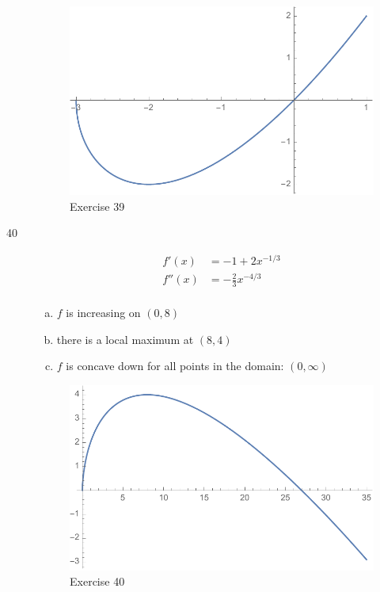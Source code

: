 \documentclass[letterpaper]{exam}
\begin{document}
\begin{description}
      \begin{figure}[H]
        \centering
        \includegraphics[scale = 0.6]{ex39.pdf}
        \caption{Exercise 39}
        \label{fig:ex39}
      \end{figure}

    \newpage

    \item[40]
      \begin{align*}
        f'(x)  & = -1 + 2x^{-1/3} \\
        f''(x) & = -\frac{2}{3} x^{-4/3} \\
      \end{align*}

      \begin{enumerate}[(a)]
        \item $f$ is increasing on $(0, 8)$

        \item there is a local maximum at $(8, 4)$ 

        \item $f$ is concave down for all points in the domain: $(0, \infty)$

      \end{enumerate}

      \begin{figure}[H]
        \centering
        \includegraphics[scale = 0.6]{ex40.pdf}
        \caption{Exercise 40}
        \label{fig:ex40}
      \end{figure}

  \end{description}
\end{document}
